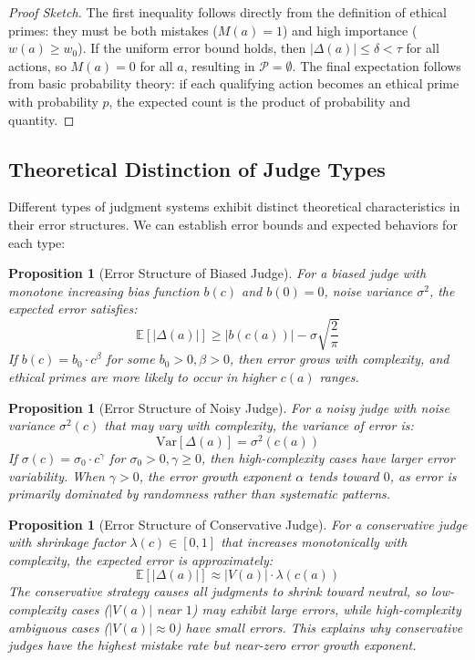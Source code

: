 \documentclass[12pt,a4paper]{article}
\newtheorem{proposition}[theorem]{Proposition}
\theoremstyle{definition}
\theoremstyle{remark}
\begin{document}
\begin{proof}[Proof Sketch]
The first inequality follows directly from the definition of ethical primes: they must be both mistakes ($M(a) = 1$) and high importance ($w(a) \geq w_0$). If the uniform error bound holds, then $|\Delta(a)| \leq \delta < \tau$ for all actions, so $M(a) = 0$ for all $a$, resulting in $\mathcal{P} = \emptyset$. The final expectation follows from basic probability theory: if each qualifying action becomes an ethical prime with probability $p$, the expected count is the product of probability and quantity.
\end{proof}

\subsection{Theoretical Distinction of Judge Types}

Different types of judgment systems exhibit distinct theoretical characteristics in their error structures. We can establish error bounds and expected behaviors for each type:

\begin{proposition}[Error Structure of Biased Judge]
\label{prop:biased_error}
For a biased judge with monotone increasing bias function $b(c)$ and $b(0) = 0$, noise variance $\sigma^2$, the expected error satisfies:
\[
\mathbb{E}[|\Delta(a)|] \geq |b(c(a))| - \sigma \sqrt{\frac{2}{\pi}}
\]
If $b(c) = b_0 \cdot c^\beta$ for some $b_0 > 0, \beta > 0$, then error grows with complexity, and ethical primes are more likely to occur in higher $c(a)$ ranges.
\end{proposition}

\begin{proposition}[Error Structure of Noisy Judge]
\label{prop:noisy_error}
For a noisy judge with noise variance $\sigma^2(c)$ that may vary with complexity, the variance of error is:
\[
\text{Var}[\Delta(a)] = \sigma^2(c(a))
\]
If $\sigma(c) = \sigma_0 \cdot c^\gamma$ for $\sigma_0 > 0, \gamma \geq 0$, then high-complexity cases have larger error variability. When $\gamma > 0$, the error growth exponent $\alpha$ tends toward $0$, as error is primarily dominated by randomness rather than systematic patterns.
\end{proposition}

\begin{proposition}[Error Structure of Conservative Judge]
\label{prop:conservative_error}
For a conservative judge with shrinkage factor $\lambda(c) \in [0,1]$ that increases monotonically with complexity, the expected error is approximately:
\[
\mathbb{E}[|\Delta(a)|] \approx |V(a)| \cdot \lambda(c(a))
\]
The conservative strategy causes all judgments to shrink toward neutral, so low-complexity cases ($|V(a)|$ near $1$) may exhibit large errors, while high-complexity ambiguous cases ($|V(a)| \approx 0$) have small errors. This explains why conservative judges have the highest mistake rate but near-zero error growth exponent.
\end{proposition}
\end{document}
